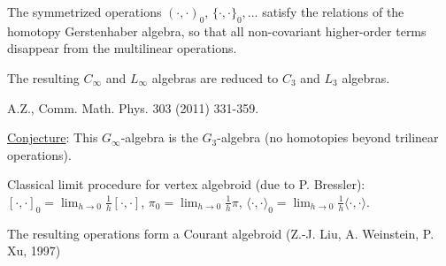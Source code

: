 \documentclass[9pt]{beamer}
\begin{document}
\begin{frame}[t]

The symmetrized operations $(\cdot, \cdot)_0$, $\{\cdot,\cdot\}_0, \dots$ satisfy the relations of the homotopy Gerstenhaber algebra, so that all non-covariant higher-order terms disappear from the multilinear operations. \\

\vspace*{3mm}

The resulting $C_{\infty}$ and $L_{\infty}$ algebras are reduced to $C_3$ and $L_3$ algebras.  \\
\vspace*{3mm}

\hfill {\color{blue} \tiny{A.Z., Comm. Math. Phys. 303 (2011) 331-359.}}

\vspace*{5mm} \underline{Conjecture}: This $G_{\infty}$-algebra is the $G_3$-algebra (no homotopies beyond trilinear operations).

\vspace*{5mm}
Classical limit procedure for vertex algebroid (due to P. Bressler): $[\cdot, \cdot]_0=\lim_{h\to 0}\frac{1}{h}[\cdot, \cdot]$, $\pi_0=\lim_{h\to 0}\frac{1}{h}\pi$, 
$\langle\cdot, \cdot\rangle_0 =\lim_{h\to 0}\frac{1}{h}\langle\cdot, \cdot\rangle$.\\

\vspace{5mm}

The resulting operations form a Courant algebroid (Z.-J. Liu, A. Weinstein, P. Xu, 1997)

\end{frame}
\end{document}
